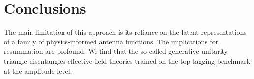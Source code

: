 \section{Conclusions}\label{sec:conclusions}

The main limitation of this approach is its reliance on the latent
representations of a family of physics-informed antenna functions. The
implications for resummation are profound. We find that the so-called
generative unitarity triangle disentangles effective field theories
trained on the top tagging benchmark at the amplitude level.

